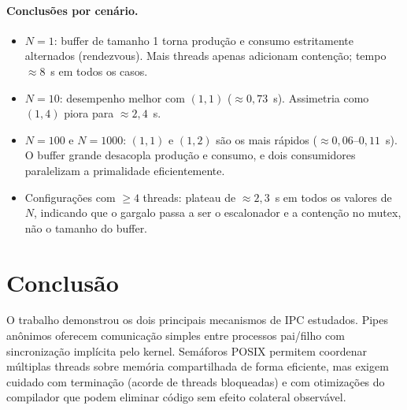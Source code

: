 \documentclass[12pt,a4paper]{article}
\begin{document}
\paragraph{Conclusões por cenário.}
\begin{itemize}
    \item $N = 1$: buffer de tamanho 1 torna produção e consumo
          estritamente alternados (rendezvous). Mais threads apenas
          adicionam contenção; tempo $\approx 8$~s em todos os casos.
    \item $N = 10$: desempenho melhor com $(1,1)$ ($\approx 0{,}73$~s).
          Assimetria como $(1,4)$ piora para $\approx 2{,}4$~s.
    \item $N = 100$ e $N = 1000$: $(1,1)$ e $(1,2)$ são os mais rápidos
          ($\approx 0{,}06$–$0{,}11$~s). O buffer grande desacopla
          produção e consumo, e dois consumidores paralelizam a
          primalidade eficientemente.
    \item Configurações com $\geq 4$ threads: plateau de $\approx 2{,}3$~s
          em todos os valores de $N$, indicando que o gargalo passa a
          ser o escalonador e a contenção no mutex, não o tamanho do buffer.
\end{itemize}

\section{Conclusão}

O trabalho demonstrou os dois principais mecanismos de IPC estudados.
Pipes anônimos oferecem comunicação simples entre processos pai/filho com
sincronização implícita pelo kernel. Semáforos POSIX permitem coordenar
múltiplas threads sobre memória compartilhada de forma eficiente, mas
exigem cuidado com terminação (acorde de threads bloqueadas) e com
otimizações do compilador que podem eliminar código sem efeito colateral
observável.
\end{document}
